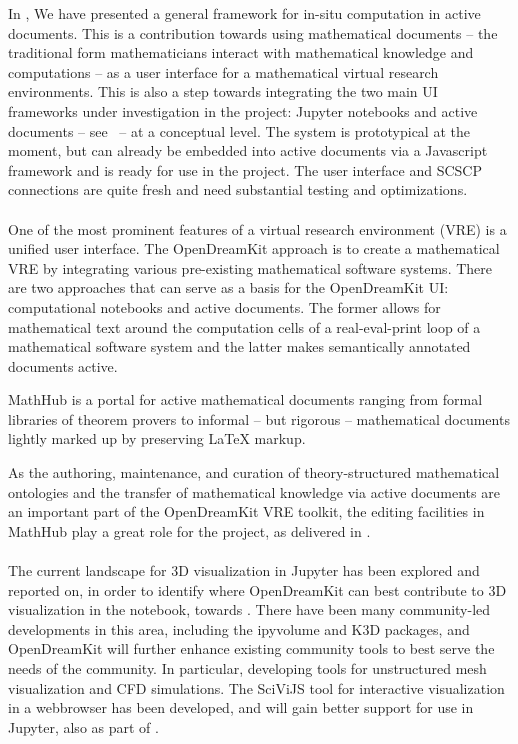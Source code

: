 \documentclass{deliverablereport}
\begin{document}
In , We have presented a general framework for in-situ computation in active documents. This is
a contribution towards using mathematical documents -- the traditional form mathematicians
interact with mathematical knowledge and computations -- as a user interface for a
mathematical virtual research environments. This is also a step towards integrating the
two main UI frameworks under investigation in the \ODK project: Jupyter notebooks and
active documents -- see~ -- at a conceptual level. The system is
prototypical at the moment, but can already be embedded into active documents via a
Javascript framework and is ready for use in the \ODK project. The user interface and SCSCP
connections are quite fresh and need substantial testing and optimizations.


\paragraph{}

One of the most prominent features of a virtual research environment (VRE) is a unified user interface. The OpenDreamKit approach is to create a mathematical VRE by integrating various pre-existing mathematical software systems. There are two approaches that can serve as a basis for the OpenDreamKit UI: computational notebooks and active documents. The former allows for mathematical text around the computation cells of a real-eval-print loop of a mathematical software system and the latter makes semantically annotated documents active.

MathHub is a portal for active mathematical documents ranging from formal libraries of theorem provers to informal – but rigorous – mathematical documents lightly marked up by preserving LaTeX markup.

As the authoring, maintenance, and curation of theory-structured mathematical ontologies and the transfer of mathematical knowledge via active documents are an important part of the OpenDreamKit VRE toolkit, the editing facilities in MathHub play a great role for the project,
as delivered in .

\paragraph{}

The current landscape for 3D visualization in Jupyter has been explored and reported on,
in order to identify where OpenDreamKit can best contribute to 3D visualization in the notebook, towards . There have been many community-led developments in this area, including the ipyvolume and K3D packages, and OpenDreamKit will further enhance existing community tools to best serve the needs of the community. In particular, developing tools for unstructured mesh visualization and CFD simulations. The SciViJS tool for interactive visualization in a webbrowser has been developed, and will gain better support for use in Jupyter, also as part of .
\end{document}
